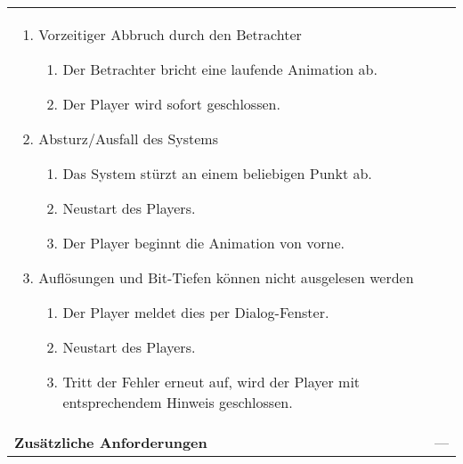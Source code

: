 \begin{longtabu}{p{0.3\textwidth}p{0.7\textwidth}}
\begin{enumerate}[label= (\alph*)]
            \item{Vorzeitiger Abbruch durch den Betrachter
                \begin{enumerate}[label= (\roman*)]
                        \item{Der Betrachter bricht eine laufende Animation
                                ab.}
                        \item{Der Player wird sofort geschlossen.}
                \end{enumerate}
            }
            \item{Absturz/Ausfall des Systems
                \begin{enumerate}[label= (\roman*)]
                        \item{Das System stürzt an einem beliebigen Punkt
                                ab.}
                        \item{Neustart des Players.}
                        \item{Der Player beginnt die Animation von vorne.}
                \end{enumerate}
            }
            \item{Auflösungen und Bit-Tiefen können nicht ausgelesen werden
                \begin{enumerate}[label= (\roman*)]
                    \item{Der Player meldet dies per Dialog-Fenster.}
                    \item{Neustart des Players.}
                    \item{Tritt der Fehler erneut auf, wird der Player mit
                            entsprechendem Hinweis geschlossen.}
                \end{enumerate}
            }
        \end{enumerate} \\
    \cmidrule(r){1-1}\cmidrule(lr){2-2}
        \textbf{Zusätzliche Anforderungen} &
        ---\\
    \bottomrule
\end{longtabu}
